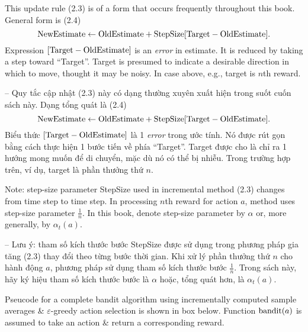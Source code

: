 \documentclass{article}
\begin{document}
\begin{itemize}
\begin{itemize}
        This update rule (2.3) is of a form that occurs frequently throughout this book. General form is (2.4)
        \begin{equation*}
            {\rm NewEstimate}\leftarrow{\rm OldEstimate} + {\rm StepSize}[{\rm Target} - {\rm OldEstimate}].
        \end{equation*}
        Expression $[{\rm Target} - {\rm OldEstimate}]$ is an {\it error} in estimate. It is reduced by taking a step toward ``Target''. Target is presumed to indicate a desirable direction in which to move, thought it may be noisy. In case above, e.g., target is $n$th reward.

        -- Quy tắc cập nhật (2.3) này có dạng thường xuyên xuất hiện trong suốt cuốn sách này. Dạng tổng quát là (2.4)
        \begin{equation*}
            {\rm NewEstimate}\leftarrow{\rm OldEstimate} + {\rm StepSize}[{\rm Target} - {\rm OldEstimate}].
        \end{equation*}
        Biểu thức $[{\rm Target} - {\rm OldEstimate}]$ là 1 {\it error} trong ước tính. Nó được rút gọn bằng cách thực hiện 1 bước tiến về phía ``Target''. Target được cho là chỉ ra 1 hướng mong muốn để di chuyển, mặc dù nó có thể bị nhiễu. Trong trường hợp trên, ví dụ, target là phần thưởng thứ $n$.

        Note: step-size parameter StepSize used in incremental method (2.3) changes from time step to time step. In processing $n$th reward for action $a$, method uses step-size parameter $\frac{1}{n}$. In this book, denote step-size parameter by $\alpha$ or, more generally, by $\alpha_t(a)$.

        -- Lưu ý: tham số kích thước bước StepSize được sử dụng trong phương pháp gia tăng (2.3) thay đổi theo từng bước thời gian. Khi xử lý phần thưởng thứ $n$ cho hành động $a$, phương pháp sử dụng tham số kích thước bước $\frac{1}{n}$. Trong sách này, hãy ký hiệu tham số kích thước bước là $\alpha$ hoặc, tổng quát hơn, là $\alpha_t(a)$.

        Pseucode for a complete bandit algorithm using incrementally computed sample averages \& $\varepsilon$-greedy action selection is shown in box below. Function ${\rm bandit}(a)$ is assumed to take an action \& return a corresponding reward.


\end{itemize}
\end{itemize}
\end{document}
